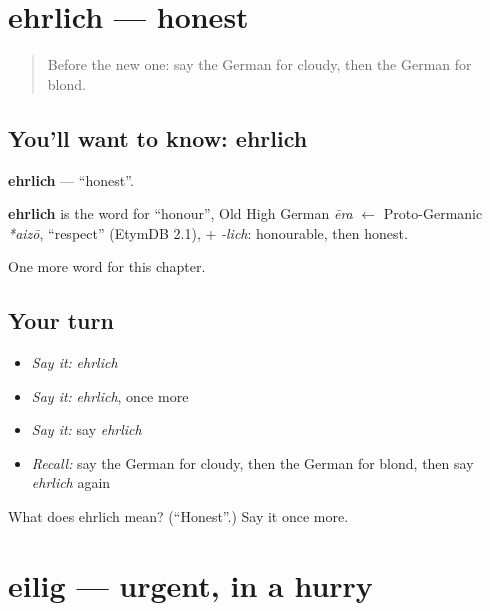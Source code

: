 \section[ehrlich]{ehrlich — honest}

\label{lesson:GE-C212-ehrlich}



\begin{quote}
Before the new one: say the German for cloudy, then the German for blond.
\end{quote}

\subsection*{You'll want to know: ehrlich}
\textbf{ehrlich} — \textquotedblleft{}honest\textquotedblright{}.

\begin{cousinweb}
\textbf{ehrlich} is the word for \textquotedblleft{}honour\textquotedblright{}, Old High German \emph{ēra} $\leftarrow$ Proto-Germanic \emph{*aizō}, \textquotedblleft{}respect\textquotedblright{} (EtymDB 2.1), + \emph{-lich}: honourable, then honest.
\end{cousinweb}

\begin{grammarlens}[title={What you've built}]
One more word for this chapter.
\end{grammarlens}

\subsection*{Your turn}
\begin{itemize}
\raggedright
  \item \emph{Say it:} \emph{ehrlich}
  \item \emph{Say it:} \emph{ehrlich}, once more
  \item \emph{Say it:} say \emph{ehrlich}
  \item \emph{Recall:} say the German for cloudy, then the German for blond, then say \emph{ehrlich} again
\end{itemize}

\begin{tcolorbox}[breakable,colback=teal!4,colframe=teal!35!black,title={Before you move on}]
What does ehrlich mean? (\textquotedblleft{}Honest\textquotedblright{}.) Say it once more.
\end{tcolorbox}
\section[eilig]{eilig — urgent, in a hurry}


